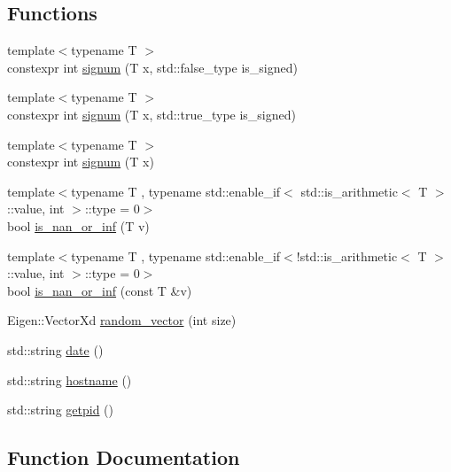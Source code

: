 \subsection*{Functions}
\begin{DoxyCompactItemize}
\item 
{\footnotesize template$<$typename T $>$ }\\constexpr int \hyperlink{namespacelimbo_1_1tools_ac56ad2bccc403ffa8341394f2fc28cda}{signum} (T x, std\+::false\+\_\+type is\+\_\+signed)
\item 
{\footnotesize template$<$typename T $>$ }\\constexpr int \hyperlink{namespacelimbo_1_1tools_a5e6d3a39db3c143a271eac9625f9779e}{signum} (T x, std\+::true\+\_\+type is\+\_\+signed)
\item 
{\footnotesize template$<$typename T $>$ }\\constexpr int \hyperlink{namespacelimbo_1_1tools_a156cca8d927600da93054c952247857b}{signum} (T x)
\item 
{\footnotesize template$<$typename T , typename std\+::enable\+\_\+if$<$ std\+::is\+\_\+arithmetic$<$ T $>$\+::value, int $>$\+::type  = 0$>$ }\\bool \hyperlink{namespacelimbo_1_1tools_abcb0caa2ffabd42fa865c9ab0b624681}{is\+\_\+nan\+\_\+or\+\_\+inf} (T v)
\item 
{\footnotesize template$<$typename T , typename std\+::enable\+\_\+if$<$!std\+::is\+\_\+arithmetic$<$ T $>$\+::value, int $>$\+::type  = 0$>$ }\\bool \hyperlink{namespacelimbo_1_1tools_af4ca69df04108670f0cc61e4a8ae7367}{is\+\_\+nan\+\_\+or\+\_\+inf} (const T \&v)
\item 
Eigen\+::\+Vector\+Xd \hyperlink{group__tools_ga2a64df3120a3ecd84e62640fb43722d0}{random\+\_\+vector} (int size)
\item 
std\+::string \hyperlink{group__tools_gafb48d3271e7423f8b8d94599869bd9cb}{date} ()
\item 
std\+::string \hyperlink{group__tools_ga4810ffa502d791d6ad750739a953f56f}{hostname} ()
\item 
std\+::string \hyperlink{group__tools_ga4ee13d198367d07cabd37316e671db09}{getpid} ()
\end{DoxyCompactItemize}


\subsection{Function Documentation}
\hypertarget{namespacelimbo_1_1tools_abcb0caa2ffabd42fa865c9ab0b624681}{}

